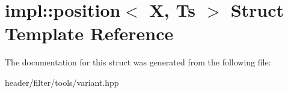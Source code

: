 \hypertarget{structimpl_1_1position}{}\section{impl\+:\+:position$<$ X, Ts $>$ Struct Template Reference}
\label{structimpl_1_1position}


The documentation for this struct was generated from the following file\+:\begin{DoxyCompactItemize}
\item 
header/filter/tools/variant.\+hpp\end{DoxyCompactItemize}
